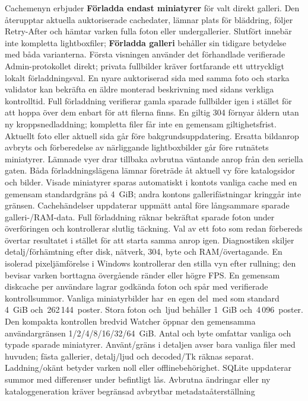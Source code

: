 \documentclass[11pt,a4paper]{article}
\begin{document}
Cachemenyn erbjuder \textbf{Förladda endast miniatyrer} för valt direkt
galleri. Den återupptar aktuella auktoriserade cachedater, lämnar plats för
bläddring, följer Retry-After och hämtar varken fulla foton eller undergallerier.
Slutfört innebär inte kompletta lightboxfiler; \textbf{Förladda galleri}
behåller sin tidigare betydelse med båda varianterna.
Första visningen använder det förhandlade verifierade Admin-protokollet direkt;
privata fullbilder kräver fortfarande ett uttryckligt lokalt förladdningsval.
En nyare auktoriserad sida med samma foto och starka validator kan bekräfta
en äldre monterad beskrivning med sidans verkliga kontrolltid.
Full förladdning verifierar gamla sparade fullbilder igen i stället för att
hoppa över dem enbart för att filerna finns. En giltig 304 förnyar åldern utan
ny kroppsnedladdning; kompletta filer får inte en gemensam giltighetsfrist.
Aktuellt foto eller aktuell sida går före bakgrundsuppdatering. Ersatta bildanrop
avbryts och förberedelse av närliggande lightboxbilder går före rutnätets miniatyrer.
Lämnade vyer drar tillbaka avbrutna väntande anrop från den seriella gaten.
Båda förladdningslägena lämnar företräde åt aktuell vy före katalogsidor och bilder.
Visade miniatyrer sparas automatiskt i kontots vanliga cache med en gemensam
standardgräns på 4~GiB; andra kontons gallerifästningar kringgår inte gränsen.
Cachehändelser uppdaterar uppmätt antal före långsammare sparade galleri-/RAM-data.
Full förladdning räknar bekräftat sparade foton under överföringen och kontrollerar
slutlig täckning. Val av ett foto som redan förbereds övertar resultatet i stället
för att starta samma anrop igen. Diagnostiken skiljer detalj/förhämtning efter
disk, nätverk, 304, byte och RAM/övertagande.
En isolerad pixeljämförelse i Windows kontrollerar den stilla vyn efter
rullning; den bevisar varken borttagna övergående ränder eller högre FPS.
En gemensam diskcache per användare lagrar godkända foton och spår med
verifierade kontrollsummor. Vanliga miniatyrbilder har~en egen del~med
som standard 4~GiB och~262\,144~poster. Stora foton och~ljud behåller 1~GiB och~4\,096~poster.
Den kompakta kontrollen bredvid Watcher öppnar den gemensamma
användargränsen 1/2/4/8/16/32/64~GiB. Antal och byte omfattar vanliga och typade
sparade miniatyrer. Använt/gräns i detaljen avser bara vanliga filer med huvuden;
fästa gallerier, detalj/ljud och decoded/Tk
räknas separat. Laddning/okänt betyder varken noll eller offlinebehörighet.
SQLite uppdaterar summor med differenser under befintligt lås. Avbrutna ändringar
eller ny kataloggeneration kräver begränsad avbrytbar metadataåterställning
\end{document}
